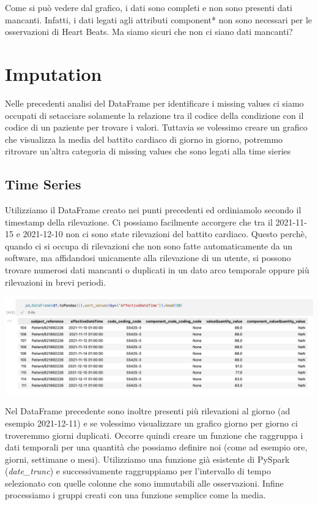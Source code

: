 \documentclass[11pt, oneside]{article}
\begin{document}
Come si può vedere dal grafico, i dati sono completi e non sono presenti dati mancanti. Infatti, i dati legati agli attributi component* non sono necessari per le osservazioni di Heart Beats. Ma siamo sicuri che non ci siano dati mancanti?

\section{Imputation}

Nelle precedenti analisi del DataFrame per identificare i missing values ci siamo occupati di setacciare solamente la relazione tra il codice della condizione con il codice di un paziente per trovare i valori. Tuttavia se volessimo creare un grafico che visualizza la media del battito cardiaco di giorno in giorno, potremmo ritrovare un'altra categoria di missing values che sono legati alla time sieries

\subsection{Time Series}

Utilizziamo il DataFrame creato nei punti precedenti ed ordiniamolo secondo il timestamp della rilevazione. Ci possiamo facilmente accorgere che tra il 2021-11-15 e 2021-12-10 non ci sono state rilevazioni del battito cardiaco. Questo perchè, quando ci si occupa di rilevazioni che non sono fatte automaticamente da un software, ma affidandosi unicamente alla rilevazione di un utente, si possono trovare numerosi dati mancanti o duplicati in un dato arco temporale oppure più rilevazioni in brevi periodi.

\begin{center}
\includegraphics[scale=0.45]{2_sort.png}
\end{center}

Nel DataFrame precedente sono inoltre presenti più rilevazioni al giorno (ad esempio 2021-12-11) e se volessimo visualizzare un grafico giorno per giorno ci troveremmo giorni duplicati. Occorre quindi creare un funzione che raggruppa i dati temporali per una quantità che possiamo definire noi (come ad esempio ore, giorni, settimane o mesi). Utilizziamo una funzione già esistente di PySpark (\emph{date\_trunc}) e successivamente raggruppiamo per l'intervallo di tempo selezionato con quelle colonne che sono immutabili alle osservazioni. Infine processiamo i gruppi creati con una funzione semplice come la media.
\end{document}

